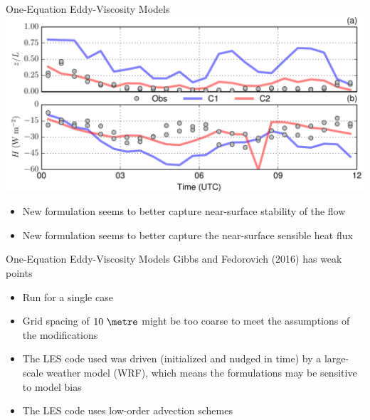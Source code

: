 \begin{frame}{One-Equation Eddy-Viscosity Models}
\includegraphics[width=\textwidth]{Gibbs_Fig8.pdf}
\begin{itemize}
	\item New formulation seems to better capture near-surface stability of the flow
	\item New formulation seems to better capture the near-surface sensible heat flux
\end{itemize}

\end{frame}


\begin{frame}{One-Equation Eddy-Viscosity Models}
Gibbs and Fedorovich (2016) has weak points
\begin{itemize}
	\item Run for a single case
	\item Grid spacing of $10\ \metre$ might be too coarse to meet the assumptions of the modifications
	\item The LES code used was driven (initialized and nudged in time) by a large-scale weather model (WRF), which means the formulations may be sensitive to model bias
	\item The LES code uses low-order advection schemes
\end{itemize}

\end{frame}

